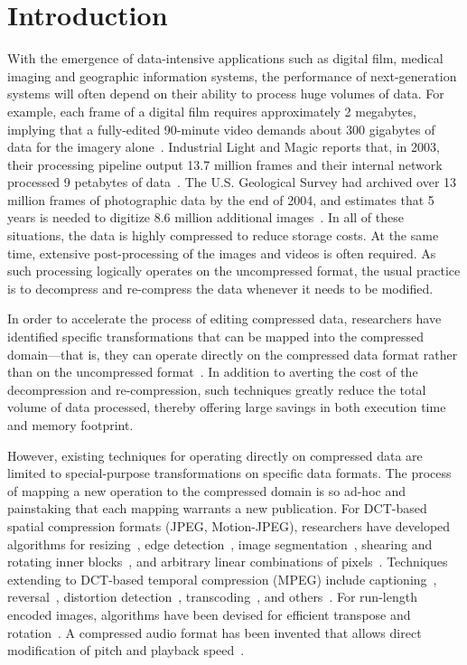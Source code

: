 \section{Introduction}

With the emergence of data-intensive applications such as digital
film, medical imaging and geographic information systems, the
performance of next-generation systems will often depend on their
ability to process huge volumes of data.  For example, each frame of a
digital film requires approximately 2 megabytes, implying that a
fully-edited 90-minute video demands about 300 gigabytes of data for
the imagery alone~\cite{ibm-video}.  Industrial Light and Magic
reports that, in 2003, their processing pipeline output 13.7 million
frames and their internal network processed 9 petabytes of
data~\cite{ilm-interview}.  The U.S. Geological Survey had archived
over 13 million frames of photographic data by the end of 2004, and
estimates that 5 years is needed to digitize 8.6 million additional
images~\cite{usgs}.  In all of these situations, the data is highly
compressed to reduce storage costs.  At the same time, extensive
post-processing of the images and videos is often required.  As such
processing logically operates on the uncompressed format, the usual
practice is to decompress and re-compress the data whenever it needs
to be modified.

In order to accelerate the process of editing compressed data,
researchers have identified specific transformations that can be
mapped into the compressed domain---that is, they can operate directly
on the compressed data format rather than on the uncompressed
format~\cite{chang95survey,mandal95survey,smith95survey,wee02survey}.
In addition to averting the cost of the decompression and
re-compression, such techniques greatly reduce the total volume of
data processed, thereby offering large savings in both execution time
and memory footprint.

However, existing techniques for operating directly on compressed data
are limited to special-purpose transformations on specific data
formats.  The process of mapping a new operation to the compressed
domain is so ad-hoc and painstaking that each mapping warrants a new
publication.  For DCT-based spatial compression formats (JPEG,
Motion-JPEG), researchers have developed algorithms for
resizing~\cite{dugad01,mukherjee02}, edge
detection~\cite{shen96,shen96b}, image segmentation~\cite{feng03},
shearing and rotating inner blocks~\cite{shen98}, and arbitrary linear
combinations of pixels~\cite{smith96b}.  Techniques extending to
DCT-based temporal compression (MPEG) include captioning~\cite{nang00},
reversal~\cite{vasudev98}, distortion detection~\cite{dorai00},
transcoding~\cite{smith98}, and others~\cite{wee02survey}.  For
run-length encoded images, algorithms have been devised for efficient
transpose and rotation~\cite{misra99,shoji95}.  A compressed audio
format has been invented that allows direct modification of pitch and
playback speed~\cite{levine98}.


